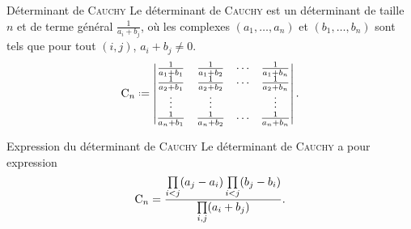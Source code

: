 \begin{defi}{Déterminant de \textsc{Cauchy}}
    Le déterminant de \textsc{Cauchy} est un déterminant de taille $n$ et de terme général $\frac{1}{a_i+b_j}$, où les complexes $(a_1, \dots, a_n)$ et $(b_1, \dots, b_n)$ sont tels que pour tout $(i, j)$, $a_i+b_j \not= 0$.
    $$\Cauchy_n \defeq \begin{vmatrix}
        \frac{1}{a_1+b_1} & \frac{1}{a_1+b_2} & \cdots & \frac{1}{a_1+b_n} \\
        \frac{1}{a_2+b_1} & \frac{1}{a_2+b_2} & \cdots & \frac{1}{a_2+b_n} \\
        \vdots & \vdots & & \vdots \\
        \frac{1}{a_n+b_1} & \frac{1}{a_n+b_2} & \cdots & \frac{1}{a_n+b_n}
    \end{vmatrix}.$$
\end{defi}

\begin{prop}{Expression du déterminant de \textsc{Cauchy}}
    Le déterminant de \textsc{Cauchy} a pour expression
    $$\mathrm{C}_n = \frac{\prod\limits_{i<j}(a_j-a_i) \prod\limits_{i<j}(b_j-b_i)}{\prod\limits_{i,j}(a_i+b_j)}.$$
\end{prop}
        
